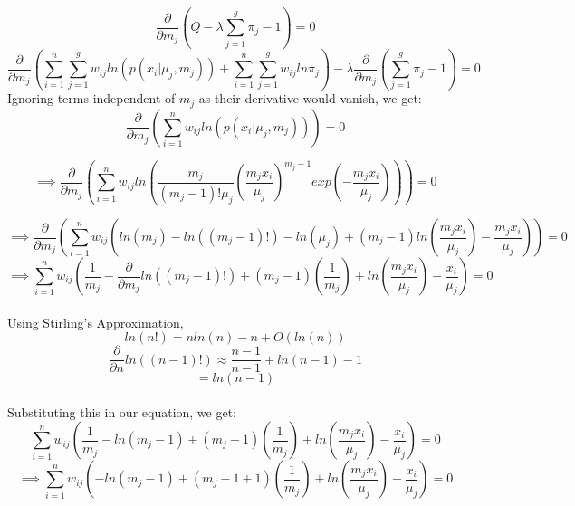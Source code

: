 \documentclass[12pt]{article}
\numberwithin{equation}{section}
\numberwithin{figure}{section}
\numberwithin{table}{section}
\begin{document}
\begin{itemize}
\begin{equation*}
\frac{\partial}{\partial m_j}\left( Q-\lambda\sum\limits_{j=1}^{g}\pi_j-1\right) = 0
\end{equation*}
\begin{equation*}
\frac{\partial}{\partial m_j}\left( 
\sum\limits_{i=1}^{n}\sum\limits_{j=1}^{g}w_{ij}ln(p(x_i|\mu_j,m_j)) + \sum\limits_{i=1}^{n}\sum\limits_{j=1}^{g}w_{ij}ln\pi_j
\right)
- \lambda\frac{\partial}{\partial m_j}\left(\sum\limits_{j=1}^{g}\pi_j-1\right) = 0
\end{equation*}
Ignoring terms independent of $m_j$ as their derivative would vanish, we get:\\
\begin{equation*}
\frac{\partial}{\partial m_j}\left( 
\sum\limits_{i=1}^{n}w_{ij}ln(p(x_i|\mu_j,m_j)) 
\right) = 0
\end{equation*}

\begin{equation*}
\implies\frac{\partial}{\partial m_j}\left( 
\sum\limits_{i=1}^{n}w_{ij}ln\left(\frac{m_j}{(m_j-1)!\mu_j}(\frac{m_jx_i}{\mu_j})^{m_j-1}exp(-\frac{m_jx_i}{\mu_j})\right) 
\right) = 0
\end{equation*}

\begin{equation*}
\implies\frac{\partial}{\partial m_j}\left( 
\sum\limits_{i=1}^{n}w_{ij}
\left(
ln(m_j) - ln((m_j-1)!) - ln(\mu_j) + (m_j-1)ln(\frac{m_jx_i}{\mu_j}) - \frac{m_jx_i}{\mu_j}
\right)
\right) = 0
\end{equation*}
\begin{equation*} 
\implies\sum\limits_{i=1}^{n}w_{ij}
\left(
\frac{1}{m_j} - \frac{\partial}{\partial m_j}ln((m_j-1)!)  +
(m_j-1)(\frac{1}{m_j}) + ln(\frac{m_jx_i}{\mu_j})
 - \frac{x_i}{\mu_j}
\right) = 0
\end{equation*}
\\Using Stirling's Approximation,
\begin{equation*}
ln(n!) = n ln(n) - n + O(ln(n))
\end{equation*}
\begin{equation*}
\frac{\partial}{\partial n}ln((n-1)!) \approx 
\frac{n-1}{n-1} + ln(n-1) -1
\end{equation*}
\begin{equation*}
= ln(n-1)
\end{equation*}
\\Substituting this in our equation, we get:\\
\begin{equation*} 
\sum\limits_{i=1}^{n}w_{ij}
\left(
\frac{1}{m_j} - ln(m_j-1)  +
(m_j-1)(\frac{1}{m_j}) + ln(\frac{m_jx_i}{\mu_j})
 - \frac{x_i}{\mu_j}
\right) = 0
\end{equation*}
\begin{equation*} 
\implies\sum\limits_{i=1}^{n}w_{ij}\left( - ln(m_j-1)  + (m_j-1+1)(\frac{1}{m_j}) + ln(\frac{m_jx_i}{\mu_j}) - \frac{x_i}{\mu_j}\right) = 0
\end{equation*}


\end{itemize}
\end{document}
